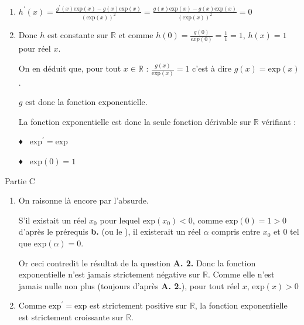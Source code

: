 \begin{corrige}
     \begin{enumerate}
          \item
          $h^{\prime}\left(x\right)=\frac{g^{\prime}\left(x\right)\text{exp}\left(x\right)-g\left(x\right)\text{exp}\left(x\right)}{\left(\text{exp}\left(x\right)\right)^{2}}=\frac{g\left(x\right)\text{exp}\left(x\right)-g\left(x\right)\text{exp}\left(x\right)}{\left(\text{exp}\left(x\right)\right)^{2}}=0$
          \item
          Donc $h$ est constante sur $\mathbb{R}$ et comme $h\left(0\right)=\frac{g\left(0\right)}{exp\left(0\right)}=\frac{1}{1}=1$, $h\left(x\right)=1$ pour réel $x$.
          \par
          On en déduit que, pour tout $x \in  \mathbb{R}$ : $\frac{g\left(x\right)}{\text{exp}\left(x\right)}=1$ c'est à dire $g(x)=\text{exp}(x)$  .
          \par
          $g$ est donc la fonction exponentielle.
          \par
          La fonction exponentielle est donc la seule fonction dérivable sur $\mathbb{R}$ vérifiant :
          \par
          ♦  $\text{exp}^{\prime}=\text{exp}$
          \par
          ♦  $\text{exp}\left(0\right)=1$
     \end{enumerate}
     \begin{h3}Partie C\end{h3}
     \begin{enumerate}
          \item
          On raisonne là encore par l'absurde.
          \par
          S'il existait un réel $x_{0}$ pour lequel  $\text{exp}\left(x_{0}\right) < 0$, comme $\text{exp}\left(0\right)=1 > 0$ d'après le prérequis \textbf{b.} (ou le ), il existerait un réel $\alpha $ compris entre $x_{0}$ et $0$ tel que $\text{exp}\left(\alpha \right)=0$.
          \par
          Or ceci contredit le résultat de la question \textbf{A. 2.}
          Donc la fonction exponentielle n'est jamais strictement négative sur $\mathbb{R}$. Comme elle n'est jamais nulle non plus (toujours d'après \textbf{A. 2.}),  pour tout réel $x$,  $\text{exp}\left(x\right) > 0$
          \item
          Comme $\text{exp}^{\prime}=\text{exp}$ est strictement positive sur $\mathbb{R}$, la fonction exponentielle est strictement croissante sur $\mathbb{R} $.
     \end{enumerate}
\end{corrige}
